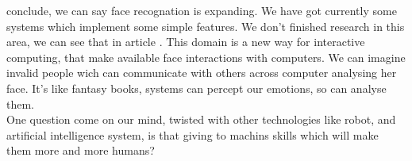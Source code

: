  conclude, we can say face recognation is expanding. We have got currently some systems which implement some simple features. We don't finished research in this area, we can see that in article \cite{lala}. This domain is a new way for interactive computing, that make available face interactions with computers. We can imagine invalid people wich can communicate with others across computer analysing her face. It's like fantasy books, systems can percept our emotions, so can analyse them. \\
One question come on our mind, twisted with other technologies like robot, and artificial intelligence system, is that giving to machins skills which will make them more and more humans?\\